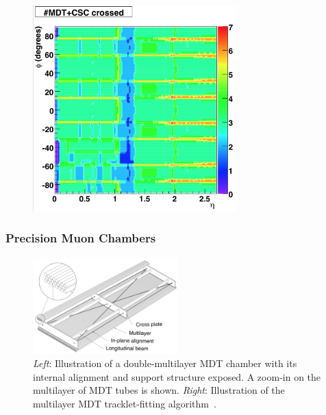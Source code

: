 \begin{figure}[!htb]
    \begin{center}
        \includegraphics[width=0.7\textwidth]{figures/chapter2/muon_spec/atlas_ms_nchamber_crossed}
        \caption{
        }
        \label{fig:muon_nchambers_crossed}
    \end{center}
\end{figure}


\subsubsection{Precision Muon Chambers}
\label{sec:muon_precision}

\begin{figure}[!htb]
    \begin{center}
        \includegraphics[width=0.5\textwidth]{figures/chapter2/muon_spec/mdt_chamber}
        \caption{
            \textit{Left}: Illustration of a double-multilayer MDT chamber with its internal alignment
                and support structure exposed. A zoom-in on the multilayer of MDT tubes is shown.
            \textit{Right}: Illustration of the multilayer MDT tracklet-fitting algorithm~\cite{MDTtrackfit}.
        }
        \label{fig:mdt_chamber}
    \end{center}
\end{figure}

